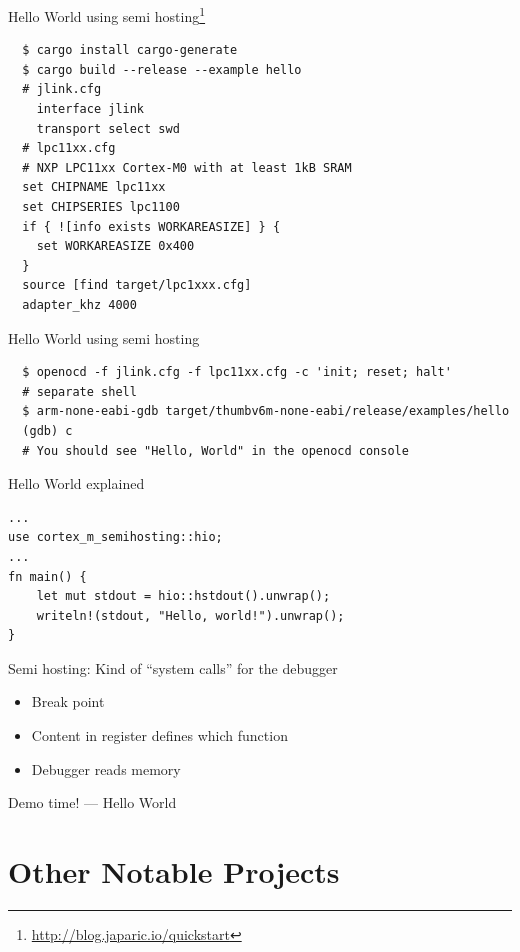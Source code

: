 \documentclass[aspectratio=1610,14pt,t]{beamer}
\begin{document}
\begin{frame}[c,fragile]{Hello World using semi hosting\footnote{\url{http://blog.japaric.io/quickstart}}}
  \begin{verbatim}
  $ cargo install cargo-generate
  $ cargo build --release --example hello
  # jlink.cfg
    interface jlink
    transport select swd
  # lpc11xx.cfg
  # NXP LPC11xx Cortex-M0 with at least 1kB SRAM
  set CHIPNAME lpc11xx
  set CHIPSERIES lpc1100
  if { ![info exists WORKAREASIZE] } {
    set WORKAREASIZE 0x400
  }
  source [find target/lpc1xxx.cfg]
  adapter_khz 4000
  \end{verbatim}
\end{frame}

\begin{frame}[c,fragile]{Hello World using semi hosting}
  \begin{verbatim}
  $ openocd -f jlink.cfg -f lpc11xx.cfg -c 'init; reset; halt'
  # separate shell
  $ arm-none-eabi-gdb target/thumbv6m-none-eabi/release/examples/hello
  (gdb) c
  # You should see "Hello, World" in the openocd console
  \end{verbatim}
\end{frame}

\begin{frame}[c,fragile]{Hello World explained}
  \begin{verbatim}
...
use cortex_m_semihosting::hio;
...
fn main() {
    let mut stdout = hio::hstdout().unwrap();
    writeln!(stdout, "Hello, world!").unwrap();
}
  \end{verbatim}
\pause Semi hosting: Kind of ``system calls'' for the debugger
  \begin{itemize}
    \item Break point
    \item Content in register defines which function
    \item Debugger reads memory
  \end{itemize}
\end{frame}

\begin{frame}[c]{Demo time! --- Hello World}
\end{frame}


\section{Other Notable Projects}
\end{document}

